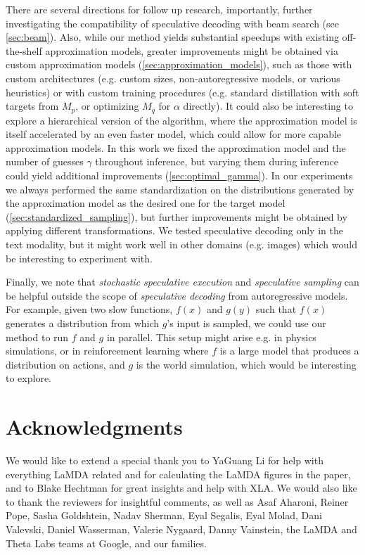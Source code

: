 \documentclass[nohyperref]{article}
\theoremstyle{plain}
\theoremstyle{definition}
\theoremstyle{remark}
\begin{document}
There are several directions for follow up research, importantly, further investigating the compatibility of speculative decoding with beam search (see \cref{sec:beam}).
Also, while our method yields substantial speedups with existing off-the-shelf approximation models, greater improvements might be obtained via custom approximation models (\cref{sec:approximation_models}), such as those with custom architectures (e.g. custom sizes, non-autoregressive models, or various heuristics) or with custom training procedures (e.g. standard distillation with soft targets from $M_p$, or optimizing $M_q$ for $\alpha$ directly).
It could also be interesting to explore a hierarchical version of the algorithm, where the approximation model is itself accelerated by an even faster model, which could allow for more capable approximation models.
In this work we fixed the approximation model and the number of guesses $\gamma$ throughout inference, but varying them during inference could yield additional improvements (\cref{sec:optimal_gamma}).
In our experiments we always performed the same standardization on the distributions generated by the approximation model as the desired one for the target model (\cref{sec:standardized_sampling}), but further improvements might be obtained by applying different transformations.
We tested speculative decoding only in the text modality, but it might work well in other domains (e.g. images) which would be interesting to experiment with.

Finally, we note that \emph{stochastic speculative execution} and \emph{speculative sampling} can be helpful outside the scope of \emph{speculative decoding} from autoregressive models. For example, given two slow functions, $f(x)$ and $g(y)$ such that $f(x)$ generates a distribution from which $g$'s input is sampled, we could use our method to run $f$ and $g$ in parallel. This setup might arise e.g. in physics simulations, or in reinforcement learning where $f$ is a large model that produces a distribution on actions, and $g$ is the world simulation, which would be interesting to explore.

\section*{Acknowledgments}
We would like to extend a special thank you to YaGuang Li for help with everything LaMDA related and for calculating the LaMDA figures in the paper, and to Blake Hechtman for great insights and help with XLA.
We would also like to thank the reviewers for insightful comments, as well as Asaf Aharoni, Reiner Pope, Sasha Goldshtein, Nadav Sherman, Eyal Segalis, Eyal Molad, Dani Valevski, Daniel Wasserman, Valerie Nygaard, Danny Vainstein, the LaMDA and Theta Labs teams at Google, and our families.
\end{document}
